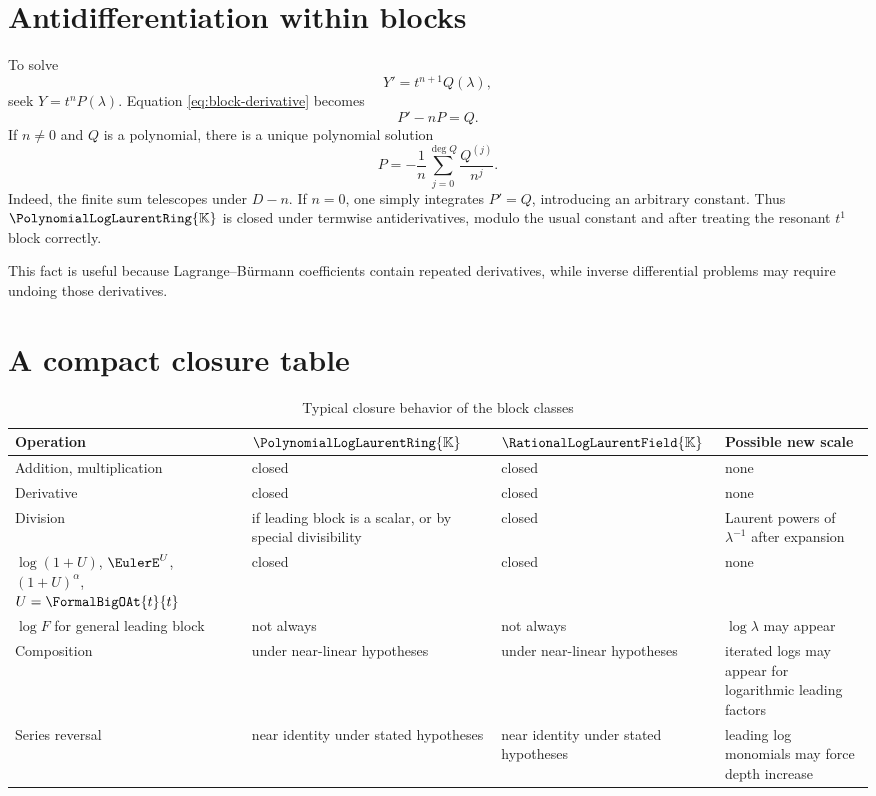 \documentclass[11pt,openany]{book}
\theoremstyle{definition}
\theoremstyle{plain}
\theoremstyle{remark}
\newcommand{\K}{\mathbb{K}}
\newcommand{\Plog}{\PolynomialLogLaurentRing{\K}}
\newcommand{\Rlog}{\RationalLogLaurentField{\K}}
\DeclareMathOperator{\polydeg}{deg}
\begin{document}
\section{Antidifferentiation within blocks}
To solve
\[
 Y'=t^{n+1}Q(\lambda),
\]
seek \(Y=t^nP(\lambda)\). Equation \cref{eq:block-derivative} becomes
\begin{equation}\label{eq:block-antiderivative-ode}
 P'-nP=Q.
\end{equation}
If \(n\ne0\) and \(Q\) is a polynomial, there is a unique polynomial solution
\begin{equation}\label{eq:block-antiderivative-solution}
 P=-\frac1n\sum_{j=0}^{\polydeg Q}\frac{Q^{(j)}}{n^j}.
\end{equation}
Indeed, the finite sum telescopes under \(D-n\). If \(n=0\), one simply integrates \(P'=Q\), introducing an arbitrary constant. Thus \(\Plog\) is closed under termwise antiderivatives, modulo the usual constant and after treating the resonant \(t^1\) block correctly.

This fact is useful because Lagrange--B\"urmann coefficients contain repeated derivatives, while inverse differential problems may require undoing those derivatives.

\section{A compact closure table}
\begin{table}[htbp]
\centering
\caption{Typical closure behavior of the block classes}\label{tab:closure}
\small
\begin{tabularx}{\textwidth}{@{}p{}XXX@{}}
\toprule
Operation & \(\Plog\) & \(\Rlog\) & Possible new scale\\
\midrule
Addition, multiplication & closed & closed & none\\
Derivative & closed & closed & none\\
Division & if leading block is a scalar, or by special divisibility & closed & Laurent powers of \(\lambda^{-1}\) after expansion\\
\(\log(1+U)\), \(\EulerE^U\), \((1+U)^\alpha\), \(U=\FormalBigOAt{t}{t}\) & closed & closed & none\\
\(\log F\) for general leading block & not always & not always & \(\log\lambda\) may appear\\
Composition & under near-linear hypotheses & under near-linear hypotheses & iterated logs may appear for logarithmic leading factors\\
Series reversal & near identity under stated hypotheses & near identity under stated hypotheses & leading log monomials may force depth increase\\
\bottomrule
\end{tabularx}
\end{table}
\end{document}

